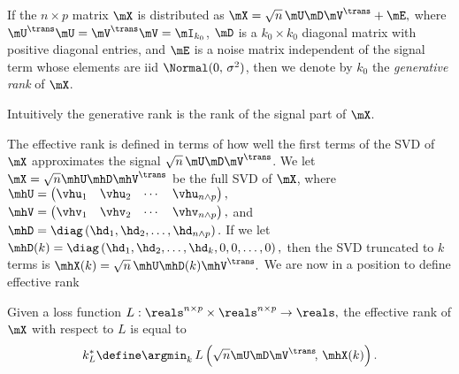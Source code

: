\begin{definition}
    If the $n \times p$ matrix $\mX$ is distributed as
    \(
        \mX = \sqrt{n} \, \mU \mD \mV^\trans + \mE,
    \)
    where $\mU^\trans \mU = \mV^\trans \mV = \mI_{k_0}$, $\mD$ is a
    $k_0 \times k_0$ diagonal matrix with positive diagonal entries, and $\mE$
    is a noise matrix independent of the signal term whose elements are
    iid $\Normal( 0, \, \sigma^2 )$, then
    we denote by $k_0$ the \emph{generative rank} of $\mX$.
\end{definition}

\noindent 
Intuitively the generative rank is the rank of the signal part of $\mX$.

The effective rank is defined in terms of how well the first terms of the
SVD of $\mX$ approximates the signal $\sqrt{n} \, \mU \mD \mV^\trans$.  We
let $\mX = \sqrt{n} \mhU \mhD \mhV^\trans$ be the full SVD of $\mX$, where
\(
    \mhU
    =
    \left(
    \begin{matrix}
        \vhu_1 & \vhu_2 & \cdots & \vhu_{n\wedge p}
    \end{matrix}
    \right),
\)
\(
    \mhV
    =
    \left(
    \begin{matrix}
        \vhv_1 & \vhv_2 & \cdots & \vhv_{n\wedge p}
    \end{matrix}
    \right),
\)
and
\(
    \mhD
    =
    \diag \left(
        \hd_1, \hd_2, \ldots, \hd_{n\wedge p}
    \right).
\)
If we let
\(
    \mhD(k)
    =
    \diag \left(
        \hd_1, \hd_2, \ldots, \hd_k, 0, 0, \ldots, 0
    \right),
\)
then the SVD truncated to $k$ terms is
\(
    \mhX(k)
    =
    \sqrt{n} \,
    \mhU \mhD(k) \mhV^\trans.
\)
We are now in a position to define effective rank

\begin{definition}
    Given a loss function
    \(
        L : \reals^{n \times p} \times \reals^{n \times p} \to \reals,
    \)
    the effective rank of $\mX$ with respect to $L$ is equal to
    \begin{equation}
        k_L^\ast
        \define
        \argmin_k \, 
            L \left( 
                \sqrt{n} \mU \mD \mV^\trans\!, \, \mhX(k) 
            \right).
    \end{equation}
\end{definition}

